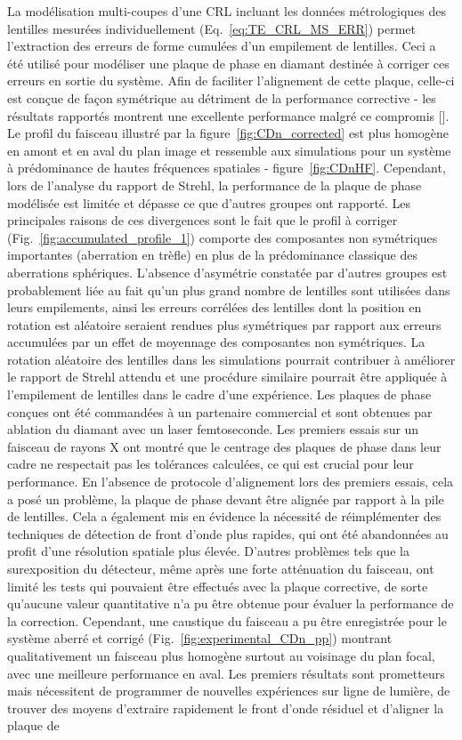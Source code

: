 \begin{refsection}
La modélisation multi-coupes d’une CRL incluant les données métrologiques des lentilles mesurées individuellement (Eq.~\ref{eq:TE_CRL_MS_ERR}) permet l'extraction des erreurs de forme cumulées d'un empilement de lentilles. Ceci a été utilisé pour modéliser une plaque de phase en diamant destinée à corriger ces erreurs en sortie du système. Afin de faciliter l’alignement de cette plaque, celle-ci est conçue de façon symétrique au détriment de la performance corrective - les résultats rapportés montrent une excellente performance malgré ce compromis [\cite{Seiboth2020,Dhamgaye2020}]. Le profil du faisceau illustré par la figure~\ref{fig:CDn_corrected} est plus homogène en amont et en aval du plan image et ressemble aux simulations pour un système à prédominance de hautes fréquences spatiales - figure~\ref{fig:CDnHF}. Cependant, lors de l'analyse du rapport de Strehl, la performance de la plaque de phase modélisée est limitée et dépasse ce que d'autres groupes ont rapporté. Les principales raisons de ces divergences sont le fait que le profil à corriger (Fig.~\ref{fig:accumulated_profile_1}) comporte des composantes non symétriques importantes (aberration en trèfle) en plus de la prédominance classique des aberrations sphériques. L'absence d'asymétrie constatée par d'autres groupes est probablement liée au fait qu'un plus grand nombre de lentilles sont utilisées dans leurs empilements, ainsi les erreurs corrélées des lentilles dont la position en rotation est aléatoire seraient rendues plus symétriques par rapport aux erreurs accumulées par un effet de moyennage des composantes non symétriques. La rotation aléatoire des lentilles dans les simulations pourrait contribuer à améliorer le rapport de Strehl attendu et une procédure similaire pourrait être appliquée à l’empilement de lentilles dans le cadre d'une expérience. Les plaques de phase conçues ont été commandées à un partenaire commercial et sont obtenues par ablation du diamant avec un laser femtoseconde. Les premiers essais sur un faisceau de rayons X ont montré que le centrage des plaques de phase dans leur cadre ne respectait pas les tolérances calculées, ce qui est crucial pour leur performance. En l’absence de protocole d’alignement lors des premiers essais, cela a posé un problème, la plaque de phase devant être alignée par rapport à la pile de lentilles. Cela a également mis en évidence la nécessité de réimplémenter des techniques de détection de front d'onde plus rapides, qui ont été abandonnées au profit d'une résolution spatiale plus élevée. D'autres problèmes tels que la surexposition du détecteur, même après une forte atténuation du faisceau, ont limité les tests qui pouvaient être effectués avec la plaque corrective, de sorte qu'aucune valeur quantitative n'a pu être obtenue pour évaluer la performance de la correction. Cependant, une caustique du faisceau a pu être enregistrée pour le système aberré et corrigé (Fig.~\ref{fig:experimental_CDn_pp}) montrant qualitativement un faisceau plus homogène surtout au voisinage du plan focal, avec une meilleure performance en aval. Les premiers résultats sont prometteurs mais nécessitent de programmer de nouvelles expériences sur ligne de lumière, de trouver des moyens d'extraire rapidement le front d'onde résiduel et d'aligner la plaque de 
\end{refsection}
